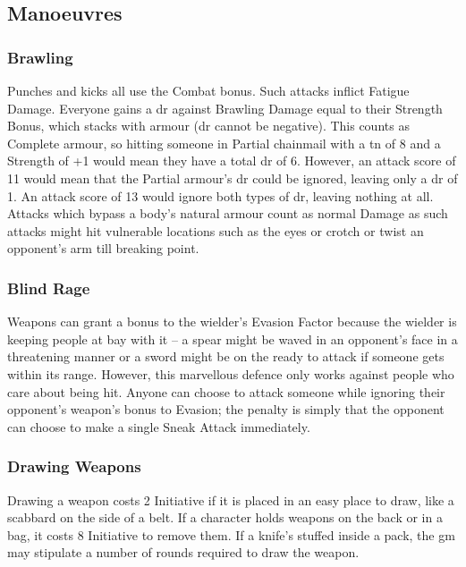 \begin{multicols}{2}
\subsection{Manoeuvres}

\subsubsection{Brawling}

Punches and kicks all use the Combat bonus. Such attacks inflict Fatigue Damage. Everyone gains a \gls{dr} against Brawling Damage equal to their Strength Bonus, which stacks with armour (\gls{dr} cannot be negative). This counts as Complete armour, so hitting someone in Partial chainmail with a \gls{tn} of 8 and a Strength of +1 would mean they have a total \gls{dr} of 6. However, an attack score of 11 would mean that the Partial armour's \gls{dr} could be ignored, leaving only a \gls{dr} of 1. An attack score of 13 would ignore both types of \gls{dr}, leaving nothing at all. Attacks which bypass a body's natural armour count as normal Damage as such attacks might hit vulnerable locations such as the eyes or crotch or twist an opponent's arm till breaking point.

\subsubsection{Blind Rage}\label{blindrage}

Weapons can grant a bonus to the wielder's Evasion Factor because the wielder is keeping people at bay with it -- a spear might be waved in an opponent's face in a threatening manner or a sword might be on the ready to attack if someone gets within its range.
However, this marvellous defence only works against people who care about being hit.
Anyone can choose to attack someone while ignoring their opponent's weapon's bonus to Evasion; the penalty is simply that the opponent can choose to make a single Sneak Attack immediately.

\subsubsection{Drawing Weapons}

Drawing a weapon costs 2 Initiative if it is placed in an easy place to draw, like a scabbard on the side of a belt. If a character holds weapons on the back or in a bag, it costs 8 Initiative to remove them. If a knife's stuffed inside a pack, the \gls{gm} may stipulate a number of \glspl{round} required to draw the weapon.


\end{multicols}
